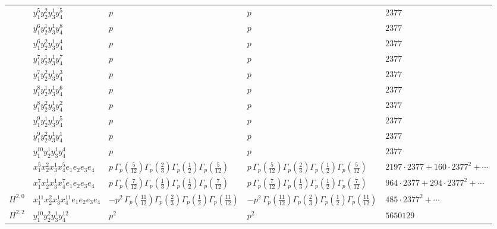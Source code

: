 \documentclass[11pt]{article}
\begin{document}
\begin{table}[ht]
{\begin{tabular}{@{}lllll@{}}
 & $y_{1}^{5} y_{2}^{2} y_{3}^{1} y_{4}^{5}$ & $p \,$ & $p \,$ & $2377$ \\
 & $y_{1}^{6} y_{2}^{1} y_{3}^{1} y_{4}^{8}$ & $p \,$ & $p \,$ & $2377$ \\
 & $y_{1}^{6} y_{2}^{2} y_{3}^{1} y_{4}^{4}$ & $p \,$ & $p \,$ & $2377$ \\
 & $y_{1}^{7} y_{2}^{1} y_{3}^{1} y_{4}^{7}$ & $p \,$ & $p \,$ & $2377$ \\
 & $y_{1}^{7} y_{2}^{2} y_{3}^{1} y_{4}^{3}$ & $p \,$ & $p \,$ & $2377$ \\
 & $y_{1}^{8} y_{2}^{1} y_{3}^{1} y_{4}^{6}$ & $p \,$ & $p \,$ & $2377$ \\
 & $y_{1}^{8} y_{2}^{2} y_{3}^{1} y_{4}^{2}$ & $p \,$ & $p \,$ & $2377$ \\
 & $y_{1}^{9} y_{2}^{1} y_{3}^{1} y_{4}^{5}$ & $p \,$ & $p \,$ & $2377$ \\
 & $y_{1}^{9} y_{2}^{2} y_{3}^{1} y_{4}^{1}$ & $p \,$ & $p \,$ & $2377$ \\
 & $y_{1}^{10} y_{2}^{1} y_{3}^{1} y_{4}^{4}$ & $p \,$ & $p \,$ & $2377$ \\
 & $x_{1}^{5} x_{2}^{2} x_{3}^{1} x_{4}^{5}  e_{1} e_{2} e_{3} e_{4}$ & $p \, \Gamma_p \left( \frac{5}{12} \right) \Gamma_p \left( \frac{2}{3} \right) \Gamma_p \left( \frac{1}{2} \right) \Gamma_p \left( \frac{5}{12} \right)$ & $p \, \Gamma_p \left( \frac{5}{12} \right) \Gamma_p \left( \frac{2}{3} \right) \Gamma_p \left( \frac{1}{2} \right) \Gamma_p \left( \frac{5}{12} \right)$ & $2197{\cdot}2377{+}160{\cdot}2377^{2}{+}\cdots$ \\
 & $x_{1}^{7} x_{2}^{1} x_{3}^{1} x_{4}^{7}  e_{1} e_{2} e_{3} e_{4}$ & $p \, \Gamma_p \left( \frac{7}{12} \right) \Gamma_p \left( \frac{1}{3} \right) \Gamma_p \left( \frac{1}{2} \right) \Gamma_p \left( \frac{7}{12} \right)$ & $p \, \Gamma_p \left( \frac{7}{12} \right) \Gamma_p \left( \frac{1}{3} \right) \Gamma_p \left( \frac{1}{2} \right) \Gamma_p \left( \frac{7}{12} \right)$ & $964{\cdot}2377{+}294{\cdot}2377^{2}{+}\cdots$ \\
\midrule
$H^{2,0}$ & $x_{1}^{11} x_{2}^{2} x_{3}^{1} x_{4}^{11}  e_{1} e_{2} e_{3} e_{4}$ & $- p^{2} \, \Gamma_p \left( \frac{11}{12} \right) \Gamma_p \left( \frac{2}{3} \right) \Gamma_p \left( \frac{1}{2} \right) \Gamma_p \left( \frac{11}{12} \right)$ & $- p^{2} \, \Gamma_p \left( \frac{11}{12} \right) \Gamma_p \left( \frac{2}{3} \right) \Gamma_p \left( \frac{1}{2} \right) \Gamma_p \left( \frac{11}{12} \right)$ & $485{\cdot}2377^{2}{+}\cdots$ \\
\midrule
$H^{2,2}$ & $y_{1}^{10} y_{2}^{2} y_{3}^{1} y_{4}^{12}$ & $p^{2} \,$ & $p^{2} \,$ & $5650129$ \\
\bottomrule
\end{tabular}
}
\renewcommand{\arraystretch}{1.0}
\end{table}

\newpage
\end{document}
